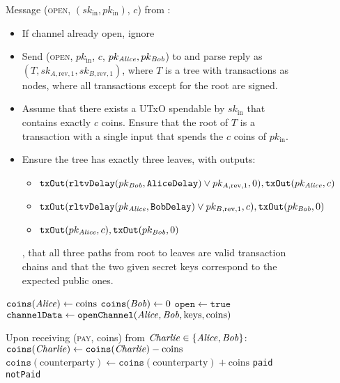 \begin{figure}[H]
\begin{systembox}{\fch}
    Message (\textsc{open}, $(sk_{\mathrm{in}}, pk_{\mathrm{in}})$, $c$) from
    \alice:
    \begin{itemize}
      \item If channel already open, ignore
      \item Send (\textsc{open}, $pk_{\mathrm{in}}$, $c$, $pk_{\mathit{Alice}},
      pk_{\mathit{Bob}}$) to \simulator{} and parse reply as $(T, sk_{A, \mathrm{rev},
      1}, sk_{B, \mathrm{rev}, 1})$, where $T$ is a tree with transactions as
      nodes, where all transactions except for the root are signed.
      \item Assume that there exists a UTxO spendable by $sk_{\mathrm{in}}$ that
      contains exactly $c$ coins. Ensure that the root of $T$ is a transaction
      with a single input that spends the $c$ coins of $pk_{\mathrm{in}}$.
      \item Ensure the tree has exactly three leaves, with outputs:
      \begin{itemize}
        \item $\mathtt{txOut}(\mathtt{rltvDelay}(pk_{\mathit{Bob}}, \mathtt{AliceDelay}) \vee pk_{A,
        \mathrm{rev}, 1}, 0), \mathtt{txOut}(pk_{\mathit{Alice}}, c)$
        \item $\mathtt{txOut}(\mathtt{rltvDelay}(pk_{\mathit{Alice}}, \mathtt{BobDelay}) \vee pk_{B,
        \mathrm{rev}, 1}, c), \mathtt{txOut}(pk_{\mathit{Bob}}, 0)$
        \item $\mathtt{txOut}(pk_{\mathit{Alice}}, c), \mathtt{txOut}(pk_{\mathit{Bob}}, 0)$
      \end{itemize},
      that all three paths from root to leaves are valid transaction chains and
      that the two given secret keys correspond to the expected public ones.
    \end{itemize}
    \begin{algorithmic}[1]
      \Indent
        \State $\mathtt{coins}(\mathit{Alice}) \gets \mathrm{coins}$
        \State $\mathtt{coins}(\mathit{Bob}) \gets 0$
        \State $\mathtt{open} \gets \mathtt{true}$
        \State $\mathtt{channelData} \gets \mathtt{openChannel}(\mathit{Alice}, \mathit{Bob},
        \mathrm{keys}, \mathrm{coins})$ 
      \EndIndent
      \Statex

      \State Upon receiving (\textsc{pay}, coins) from $\mathit{Charlie} \in \{\mathit{Alice},
      \mathit{Bob}\}$:
      \Indent
          \State $\mathtt{coins}(\mathit{Charlie}) \gets \mathtt{coins}(\mathit{Charlie}) -
          \mathrm{coins}$
          \State $\mathtt{coins}(\mathrm{counterparty}) \gets
          \mathtt{coins}(\mathrm{counterparty}) + \mathrm{coins}$
          \State \Return \texttt{paid}
        \Else
          \State \Return \texttt{notPaid}
        \EndIf
      \EndIndent
      \Statex


\end{algorithmic}
\end{systembox}
\end{figure}
